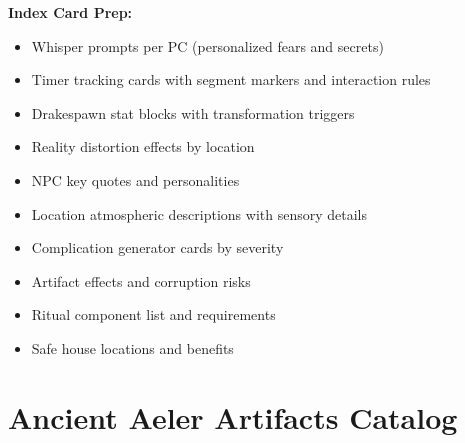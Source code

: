 \documentclass[11pt]{article}
\begin{document}
\textbf{Index Card Prep:}
\begin{itemize}
\item Whisper prompts per PC (personalized fears and secrets)
\item Timer tracking cards with segment markers and interaction rules
\item Drakespawn stat blocks with transformation triggers
\item Reality distortion effects by location
\item NPC key quotes and personalities
\item Location atmospheric descriptions with sensory details
\item Complication generator cards by severity
\item Artifact effects and corruption risks
\item Ritual component list and requirements
\item Safe house locations and benefits
\end{itemize}

\section{Ancient Aeler Artifacts Catalog}
\end{document}
